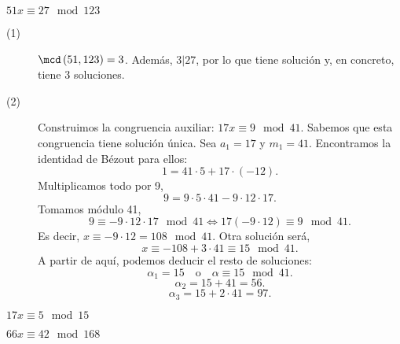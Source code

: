 \begin{eg}
\normalfont $\displaystyle 51x \equiv 27 \mod 123 $ 
\begin{description}
\item[(1)] $\displaystyle \mcd\left(51,123\right) = 3 $. Además, $\displaystyle 3 | 27 $, por lo que tiene solución y, en concreto, tiene 3 soluciones. 
\item[(2)] Construimos la congruencia auxiliar: $\displaystyle 17 x \equiv 9 \mod 41 $. Sabemos que esta congruencia tiene solución única. Sea $\displaystyle a_{1} = 17 $ y $\displaystyle m_{1} = 41 $. Encontramos la identidad de Bézout para ellos:
	\[ 1 = 41 \cdot 5 + 17 \cdot \left(-12\right) .\]
Multiplicamos todo por 9, 
\[9 = 9 \cdot 5 \cdot 41 - 9 \cdot 12 \cdot 17 .\]
Tomamos módulo 41, 
\[9 \equiv -9 \cdot 12 \cdot 17 \mod 41 \iff 17 \left(-9 \cdot 12\right) \equiv  9 \mod 41 .\]
Es decir, $\displaystyle x \equiv - 9 \cdot 12 = 108 \mod 41 $. Otra solución será, 
\[x \equiv -108 + 3 \cdot 41 \equiv 15 \mod 41 .\]
A partir de aquí, podemos deducir el resto de soluciones:
\[\alpha_{1} = 15 \quad \text{o} \quad \alpha \equiv 15 \mod 41 .\]
\[\alpha _{2} = 15 + 41 = 56 .\]
\[\alpha_{3} = 15 + 2 \cdot 41 = 97 .\]
\end{description}
\end{eg}
\begin{eg}
\normalfont $\displaystyle 17 x \equiv 5 \mod 15 $ 
\end{eg}

\begin{eg}
\normalfont $\displaystyle 66x \equiv 42 \mod 168 $ 
\end{eg}


